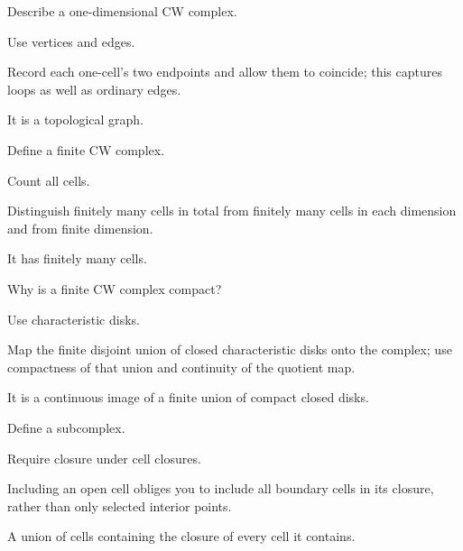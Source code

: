 \begin{exercise}\label{exr:viii06-07}
Describe a one-dimensional CW complex.
\end{exercise}
\begin{hint}
Use vertices and edges.

Record each one-cell's two endpoints and allow them to coincide; this captures loops as well as ordinary edges.
\end{hint}
\begin{solution}
It is a topological graph.
\end{solution}

\begin{exercise}\label{exr:viii06-08}
Define a finite CW complex.
\end{exercise}
\begin{hint}
Count all cells.

Distinguish finitely many cells in total from finitely many cells in each dimension and from finite dimension.
\end{hint}
\begin{solution}
It has finitely many cells.
\end{solution}

\begin{exercise}\label{exr:viii06-09}
Why is a finite CW complex compact?
\end{exercise}
\begin{hint}
Use characteristic disks.

Map the finite disjoint union of closed characteristic disks onto the complex; use compactness of that union and continuity of the quotient map.
\end{hint}
\begin{solution}
It is a continuous image of a finite union of compact closed disks.
\end{solution}

\begin{exercise}\label{exr:viii06-10}
Define a subcomplex.
\end{exercise}
\begin{hint}
Require closure under cell closures.

Including an open cell obliges you to include all boundary cells in its closure, rather than only selected interior points.
\end{hint}
\begin{solution}
A union of cells containing the closure of every cell it contains.
\end{solution}

